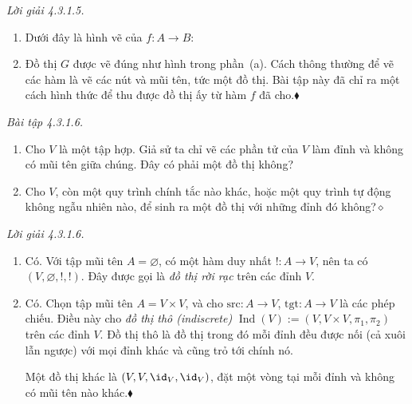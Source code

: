\noindent\textit{Lời giải 4.3.1.5.}\keepwithnext
\begin{enumerate}[label=\alph*.]
\item Dưới đây là hình vẽ của $f:A\to B$:
\begin{center}
\end{center}
\item Đồ thị $G$ được vẽ đúng như hình trong phần~(a). Cách thông thường để vẽ các hàm là vẽ các nút và mũi tên, tức một đồ thị. Bài tập này đã chỉ ra một cách hình thức để thu được đồ thị ấy từ hàm $f$ đã cho.\nobreak\hfill$\blacklozenge$
\end{enumerate}

\noindent\textit{Bài tập 4.3.1.6.}\keepwithnext
\begin{enumerate}[label=\alph*.]
\item Cho $V$ là một tập hợp. Giả sử ta chỉ vẽ các phần tử của $V$ làm đỉnh và không có mũi tên giữa chúng. Đây có phải một đồ thị không?
\item Cho $V$, còn một quy trình chính tắc nào khác, hoặc một quy trình tự động không ngẫu nhiên nào, để sinh ra một đồ thị với những đỉnh đó không?\nobreak\hfill$\diamond$
\end{enumerate}

\noindent\textit{Lời giải 4.3.1.6.}\keepwithnext
\begin{enumerate}[label=\alph*.]
\item Có. Với tập mũi tên $A=\varnothing$, có một hàm duy nhất $!:A\to V$, nên ta có $(V,\varnothing,!,!)$. Đây được gọi là \emph{đồ thị rời rạc} trên các đỉnh $V$.
\item Có. Chọn tập mũi tên $A=V\times V$, và cho $\mathrm{src}:A\to V$, $\mathrm{tgt}:A\to V$ là các phép chiếu. Điều này cho \emph{đồ thị thô (indiscrete)} $\operatorname{Ind}(V):=(V,V\times V,\pi_1,\pi_2)$ trên các đỉnh $V$. Đồ thị thô là đồ thị trong đó mỗi đỉnh đều được nối (cả xuôi lẫn ngược) với mọi đỉnh khác và cũng trỏ tới chính nó.

Một đồ thị khác là $(V,V,\id_V,\id_V)$, đặt một vòng tại mỗi đỉnh và không có mũi tên nào khác.\nobreak\hfill$\blacklozenge$
\end{enumerate}

